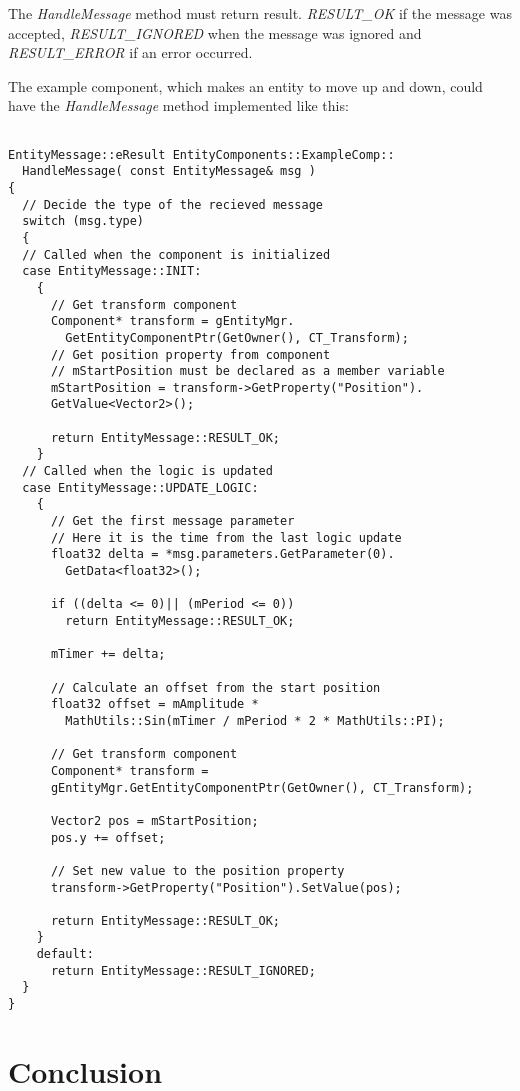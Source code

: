\documentclass[a4paper, 12pt]{report}
\begin{document}
The \emph{HandleMessage} method must return result. \emph{RESULT\_OK} if the message was accepted, \emph{RESULT\_IGNORED} when the message was ignored and \emph{RESULT\_ERROR} if an error occurred.

The example component, which makes an entity to move up and down, could have the \emph{HandleMessage} method implemented like this:

\footnotesize 
\begin{verbatim}

EntityMessage::eResult EntityComponents::ExampleComp::
  HandleMessage( const EntityMessage& msg )
{
  // Decide the type of the recieved message
  switch (msg.type)
  {
  // Called when the component is initialized
  case EntityMessage::INIT:
    {
      // Get transform component
      Component* transform = gEntityMgr.
        GetEntityComponentPtr(GetOwner(), CT_Transform);
      // Get position property from component
      // mStartPosition must be declared as a member variable
      mStartPosition = transform->GetProperty("Position").
      GetValue<Vector2>();

      return EntityMessage::RESULT_OK;
    }
  // Called when the logic is updated
  case EntityMessage::UPDATE_LOGIC:
    {
      // Get the first message parameter
      // Here it is the time from the last logic update
      float32 delta = *msg.parameters.GetParameter(0).
        GetData<float32>();

      if ((delta <= 0)|| (mPeriod <= 0))
        return EntityMessage::RESULT_OK;

      mTimer += delta;

      // Calculate an offset from the start position
      float32 offset = mAmplitude * 
        MathUtils::Sin(mTimer / mPeriod * 2 * MathUtils::PI);

      // Get transform component
      Component* transform = 
      gEntityMgr.GetEntityComponentPtr(GetOwner(), CT_Transform);

      Vector2 pos = mStartPosition;
      pos.y += offset;

      // Set new value to the position property
      transform->GetProperty("Position").SetValue(pos);

      return EntityMessage::RESULT_OK;
    }
    default:
      return EntityMessage::RESULT_IGNORED;
  }
}
\end{verbatim}
\normalsize

\section{Conclusion}
\end{document}
